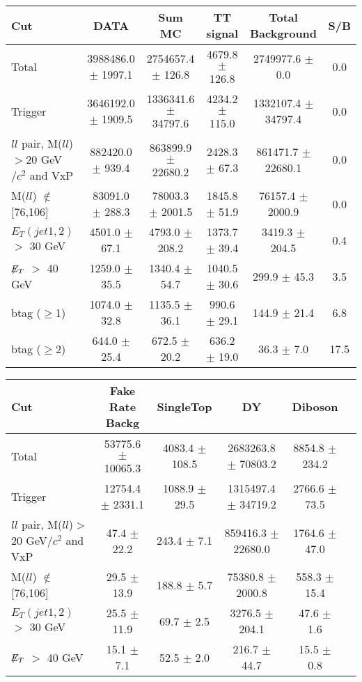 \documentclass[amsmath,amssymb]{revtex4}
\begin{document}
\clearpage
\begin{landscape}
\begin{table}[p]
\begin{tabular}{|l|c|c|c|c|c|}
\hline
\hline
Cut & DATA & Sum MC & TT signal  & Total Background & S/B \\
\hline
Total & 3988486.0 $\pm$ 1997.1 & 2754657.4 $\pm$ 126.8 & 4679.8 $\pm$ 126.8 & 2749977.6 $\pm$ 0.0 & 0.0 \\
Trigger & 3646192.0 $\pm$ 1909.5 & 1336341.6 $\pm$ 34797.6 & 4234.2 $\pm$ 115.0 & 1332107.4 $\pm$ 34797.4 & 0.0 \\
$ll$ pair, M($ll$)$>$20 GeV$/c^2$ and VxP & 882420.0 $\pm$ 939.4 & 863899.9 $\pm$ 22680.2 & 2428.3 $\pm$ 67.3 & 861471.7 $\pm$ 22680.1 & 0.0 \\
M($ll$) $\notin$ [76,106] & 83091.0 $\pm$ 288.3 & 78003.3 $\pm$ 2001.5 & 1845.8 $\pm$ 51.9 & 76157.4 $\pm$ 2000.9 & 0.0 \\
$E_T(jet1,2)$ $>$ 30 GeV & 4501.0 $\pm$ 67.1 & 4793.0 $\pm$ 208.2 & 1373.7 $\pm$ 39.4 & 3419.3 $\pm$ 204.5 & 0.4 \\
$\not\!\!E_T$ $>$ 40 GeV & 1259.0 $\pm$ 35.5 & 1340.4 $\pm$ 54.7 & 1040.5 $\pm$ 30.6 & 299.9 $\pm$ 45.3 & 3.5 \\
btag ($\ge$1) & 1074.0 $\pm$ 32.8 & 1135.5 $\pm$ 36.1 & 990.6 $\pm$ 29.1 & 144.9 $\pm$ 21.4 & 6.8 \\
btag ($\ge$2) & 644.0 $\pm$ 25.4 & 672.5 $\pm$ 20.2 & 636.2 $\pm$ 19.0 & 36.3 $\pm$ 7.0 & 17.5 \\
\hline
\hline
\end{tabular}
\begin{tabular}{|l|c|c|c|c|c|}
\hline
\hline
Cut & Fake Rate Backg & SingleTop & DY & Diboson  \\
\hline
Total & 53775.6 $\pm$ 10065.3 & 4083.4 $\pm$ 108.5 & 2683263.8 $\pm$ 70803.2 & 8854.8 $\pm$ 234.2 \\
Trigger & 12754.4 $\pm$ 2331.1 & 1088.9 $\pm$ 29.5 & 1315497.4 $\pm$ 34719.2 & 2766.6 $\pm$ 73.5 \\
$ll$ pair, M($ll$)$>$20 GeV$/c^2$ and VxP & 47.4 $\pm$ 22.2 & 243.4 $\pm$ 7.1 & 859416.3 $\pm$ 22680.0 & 1764.6 $\pm$ 47.0 \\
M($ll$) $\notin$ [76,106] & 29.5 $\pm$ 13.9 & 188.8 $\pm$ 5.7 & 75380.8 $\pm$ 2000.8 & 558.3 $\pm$ 15.4 \\
$E_T(jet1,2)$ $>$ 30 GeV & 25.5 $\pm$ 11.9 & 69.7 $\pm$ 2.5 & 3276.5 $\pm$ 204.1 & 47.6 $\pm$ 1.6 \\
$\not\!\!E_T$ $>$ 40 GeV & 15.1 $\pm$ 7.1 & 52.5 $\pm$ 2.0 & 216.7 $\pm$ 44.7 & 15.5 $\pm$ 0.8 \\

\end{tabular}
\end{table}
\end{landscape}
\end{document}
